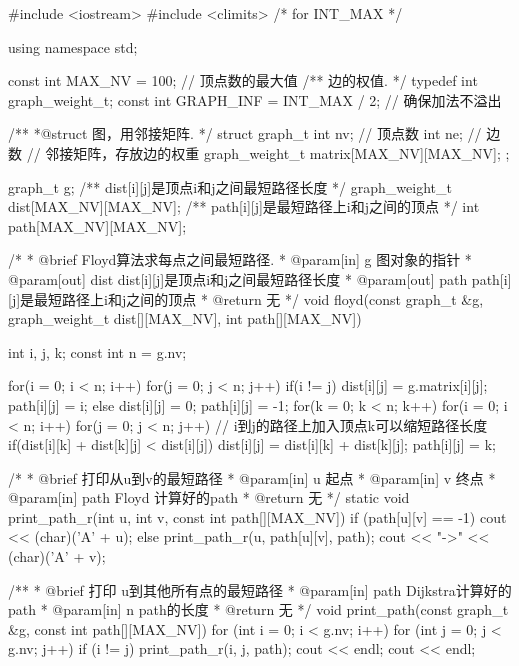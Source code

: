 \begin{Codex}[label=am_graph_floyd.cpp]
#include <iostream>
#include <climits>  /* for INT_MAX */

using namespace std;

const int MAX_NV = 100; // 顶点数的最大值
/** 边的权值. */
typedef int graph_weight_t;
const int GRAPH_INF = INT_MAX / 2;   // 确保加法不溢出

/**
 *@struct 图，用邻接矩阵.
 */
struct graph_t {
    int nv; // 顶点数
    int ne; // 边数
    // 邻接矩阵，存放边的权重
    graph_weight_t matrix[MAX_NV][MAX_NV];
};


graph_t g;
/** dist[i][j]是顶点i和j之间最短路径长度 */
graph_weight_t dist[MAX_NV][MAX_NV];
/** path[i][j]是最短路径上i和j之间的顶点 */
int path[MAX_NV][MAX_NV];


/*
  * @brief Floyd算法求每点之间最短路径.
  * @param[in] g 图对象的指针
  * @param[out] dist dist[i][j]是顶点i和j之间最短路径长度
  * @param[out] path path[i][j]是最短路径上i和j之间的顶点
  * @return 无
  */
void floyd(const graph_t &g,
       graph_weight_t dist[][MAX_NV],
       int path[][MAX_NV]) {
    int i, j, k;
    const int n = g.nv;

    for(i = 0; i < n; i++) {
        for(j = 0; j < n; j++) {
            if(i != j) {
                dist[i][j] = g.matrix[i][j];
                path[i][j] = i;
            } else {
                dist[i][j] = 0;
                path[i][j] = -1;
            }
        }
    }
    for(k = 0; k < n; k++) {
        for(i = 0; i < n; i++) {
            for(j = 0; j < n; j++) {
                // i到j的路径上加入顶点k可以缩短路径长度
                if(dist[i][k] + dist[k][j] < dist[i][j]) {
                    dist[i][j] = dist[i][k] + dist[k][j];
                    path[i][j] = k;
                }
            }
        }
    }
}

/*
 * @brief 打印从u到v的最短路径
 * @param[in] u 起点
 * @param[in] v 终点
 * @param[in] path Floyd 计算好的path
 * @return 无
 */
static void print_path_r(int u, int v, const int path[][MAX_NV]) {
    if (path[u][v] == -1) {
        cout << (char)('A' + u);
    } else {
        print_path_r(u, path[u][v], path);
        cout << "->" << (char)('A' + v);
    }
}

/**
 * @brief 打印 u到其他所有点的最短路径
 * @param[in] path Dijkstra计算好的path
 * @param[in] n path的长度
 * @return 无
 */
void print_path(const graph_t &g, const int path[][MAX_NV]) {
    for (int i = 0; i < g.nv; i++) {
        for (int j = 0; j < g.nv; j++) {
            if (i != j) {
                print_path_r(i, j, path);
                cout << endl;
            }
        }
        cout << endl;
    }
}


\end{Codex}
